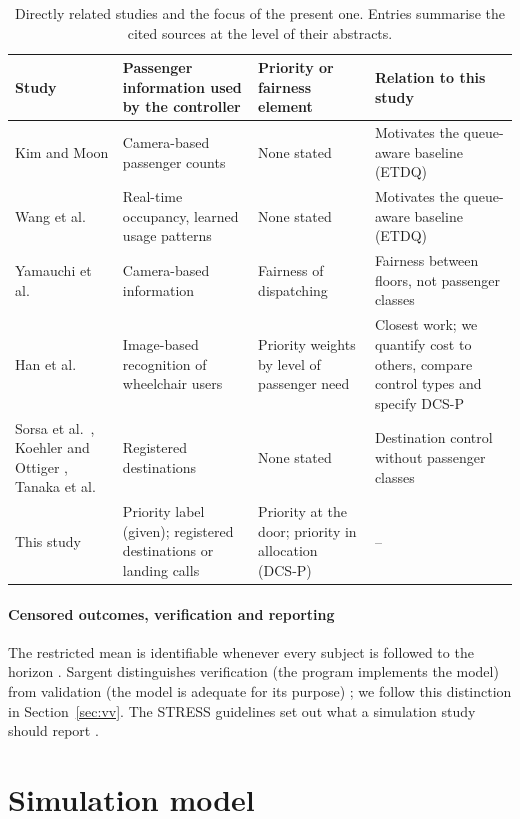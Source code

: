 \documentclass[12pt,a4paper]{article}
\begin{document}
\begin{table}[htbp]\centering
\caption{Directly related studies and the focus of the present one. Entries summarise the cited sources at the level of their abstracts.}\label{tab:related}
\footnotesize
\begin{tabular}{@{}p{.19\linewidth}p{.25\linewidth}p{.24\linewidth}p{.24\linewidth}@{}}
\toprule Study & Passenger information used by the controller & Priority or fairness element & Relation to this study\\\midrule
Kim and Moon \cite{kimmoon2001} & Camera-based passenger counts & None stated & Motivates the queue-aware baseline (ETDQ)\\
Wang et al.\ \cite{wang2021} & Real-time occupancy, learned usage patterns & None stated & Motivates the queue-aware baseline (ETDQ)\\
Yamauchi et al.\ \cite{yamauchi2019} & Camera-based information & Fairness of dispatching & Fairness between floors, not passenger classes\\
Han et al.\ \cite{han2024} & Image-based recognition of wheelchair users & Priority weights by level of passenger need & Closest work; we quantify cost to others, compare control types and specify DCS-P\\
Sorsa et al.\ \cite{sorsa2018}, Koehler and Ottiger \cite{koehler2002}, Tanaka et al.\ \cite{tanaka2005} & Registered destinations & None stated & Destination control without passenger classes\\
This study & Priority label (given); registered destinations or landing calls & Priority at the door; priority in allocation (DCS-P) & --\\
\bottomrule\end{tabular}
\end{table}

\paragraph{Censored outcomes, verification and reporting} The restricted mean is identifiable whenever every subject is followed to the horizon \cite{royston2013}. Sargent distinguishes verification (the program implements the model) from validation (the model is adequate for its purpose) \cite{sargent2013}; we follow this distinction in Section~\ref{sec:vv}. The STRESS guidelines set out what a simulation study should report \cite{monks2019}.

\section{Simulation model}\label{sec:model}
\end{document}
